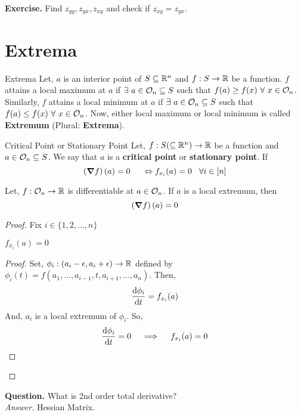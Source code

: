 \documentclass[../Analysis-3.tex]{subfiles}
\begin{document}
\textbf{Exercise.} Find $z_{yy}, z_{yx}, z_{xy}$ and check if $z_{xy} = z_{yx}$.

\section{Extrema}

\begin{Def}{Extrema}{}
  Let, $a$ is an interior point of $S \subseteq \mathbb{R}^n$ and $f : S \to \mathbb{R}$ be a function. $f$ attains a local maximum at $a$ if $\exists\ a \in \mathcal{O}_{n} \subseteq S$ such that $f(a) \geq f(x)\ \forall\ x \in \mathcal{O}_{n}$. Similarly, $f$ attains a local minimum at $a$ if $\exists\ a \in \mathcal{O}_{n} \subseteq S$ such that $f(a) \leq f(x)\ \forall\ x \in \mathcal{O}_{n}$. Now, either local maximum or local minimum is called \textbf{Extremum} (Plural: \textbf{Extrema}).
\end{Def}

\begin{Def}{Critical Point or Stationary Point}{}
  Let, $f : S (\subseteq \mathbb{R}^n) \to \mathbb{R}$ be a function and $a \in \mathcal{O}_{n} \subseteq S$. We say that $a$ is a \textbf{critical point} or \textbf{stationary point}.
  If \[ \left(\grad f\right)(a) = 0 \hspace{5mm} \Leftrightarrow f_{x_i}(a) = 0 \hspace{3mm} \forall i \in [n] \]
\end{Def}

\begin{Thm}{}{}
  Let, $f: \mathcal{O}_{n} \to \mathbb{R}$ is differentiable at $a \in \mathcal{O}_{n}$. If $a$ is a local extremum, then \[ \left(\grad f\right)(a) = 0 \]
\end{Thm}

\begin{proof}
  Fix $i \in \{1,2, \ldots, n\}$

  \begin{clmBox}
    $f_{x_i}(a) = 0$
  \end{clmBox}

  \begin{proof}
    Set, $\phi_i : (a_i - \epsilon, a_i + \epsilon) \to \mathbb{R}$ defined by $\phi_i(t) = f(a_1, \ldots, a_{i-1}, t, a_{i+1}, \ldots, a_n)$. Then, \[ \dv{\phi_i}{t}(a_i) = f_{x_i}(a) \]
    And, $a_i$ is a local extremum of $\phi_i$. So, \[ \dv{\phi_i}{t}(a_i) = 0 \quad \implies \quad f_{x_i}(a) = 0 \]
  \end{proof}
\end{proof}


\textbf{Question.} What is 2nd order total derivative? \\
\textit{Answer.} Hessian Matrix.
\end{document}
